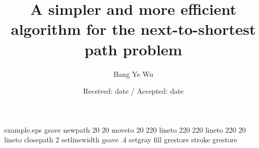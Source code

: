 
\begin{filecontents*}{example.eps}
gsave
newpath
  20 20 moveto
  20 220 lineto
  220 220 lineto
  220 20 lineto
closepath
2 setlinewidth
gsave
  .4 setgray fill
grestore
stroke
grestore
\end{filecontents*}
\RequirePackage{fix-cm}
\documentclass[smallextended]{svjour3}       \smartqed  \usepackage{graphicx}



\title{A simpler and more efficient algorithm for the next-to-shortest path problem}


\author{Bang Ye Wu}



\date{Received: date / Accepted: date}


\maketitle

\begin{abstract}
Given an undirected graph  with positive edge lengths and two vertices  and , the next-to-shortest path problem is to find an -path which length is minimum amongst all -paths strictly longer than the shortest path length. In this paper we show that the problem can be solved in linear time if the distances from  and  to all other vertices are given. Particularly our new algorithm runs in  time for general graphs, which improves the previous result of  time for sparse graphs, and takes only linear time for unweighted graphs, planar graphs, and graphs with positive integer edge lengths.  

\end{abstract}

\section{Introduction}


Let  be an undirected graph, in which  is a positive edge length function.
For , an -path is a simple path from  to , in which ``simple'' means there is no repeated vertex in the path. In this paper, a path always means a simple path.
The length of a path is the total length of all edges in the path.
An -path is a shortest -path if its length is minimum amongst all possible -paths.
The shortest path length from  to  is denoted by  which is the length of their shortest path.
A \emph{next-to-shortest} -path is an -path which length is minimum amongst those the path lengths \emph{strictly larger} than . And the next-to-shortest path problem is to find a next-to-shortest -path for given ,  and . 

